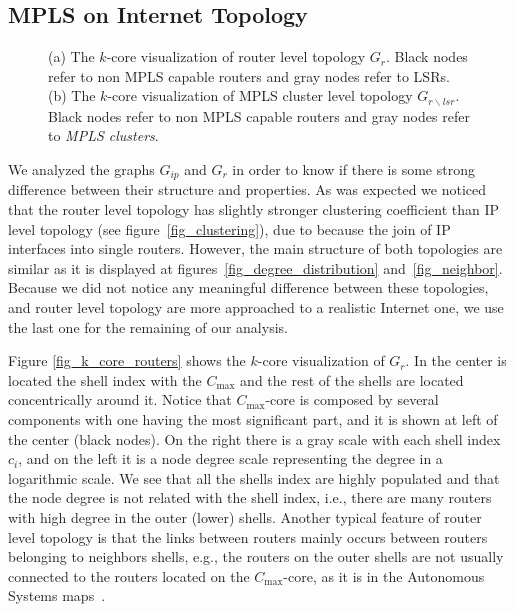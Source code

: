 \subsection{MPLS on Internet Topology}\label{cluster.topo}
\begin{figure*}[!t]
\centering
{}
\hfil
{}
\caption{ (a) The $k$-core visualization of router level topology $G_{r}$. Black nodes refer to non MPLS capable routers and gray nodes refer to LSRs. (b) The $k$-core visualization of MPLS cluster level topology  $G_{r\backslash lsr}$. Black nodes refer to non MPLS capable routers and gray nodes refer to \textit{MPLS clusters}.}
\label{fig_kcore_overview}
\end{figure*}

We analyzed the graphs $G_{ip}$ and $G_{r}$ in order to know if there is some strong difference between their structure and properties. 
As was expected we noticed that the router level topology has slightly stronger clustering coefficient than IP level topology (see figure~\ref{fig_clustering}), due to because the join of IP interfaces into single routers. 
However, the main structure of both topologies are similar as it is displayed at figures~\ref{fig_degree_distribution} and~\ref{fig_neighbor}.  
Because we did not notice any meaningful difference between these topologies, and router level topology are more approached to a realistic Internet  one, we use the last one for the remaining of our analysis.

Figure \ref{fig_k_core_routers} shows the $k$-core visualization of $G_{r}$. 
In the center is located the shell index with the $C_{\max}$  and the rest of the shells are located concentrically around it. 
Notice that $C_{\max}$-core is composed by several components with one having the most significant part, and it is shown at left of the center (black nodes).
On the right there is a gray scale with each shell index $c_i$, and on the left it is a node degree scale representing the degree in a logarithmic scale.
We see that all the shells index are highly populated and that the node degree is not related with the shell index, i.e., there are many routers with high degree in the outer (lower) shells. 
Another typical feature of router level topology is that the links between routers mainly occurs between routers belonging to neighbors shells, e.g., the routers on the outer shells are not usually connected to the routers located on the  $C_{\max}$-core, as it is in the Autonomous Systems maps~\cite{Alvarez06k}. 

